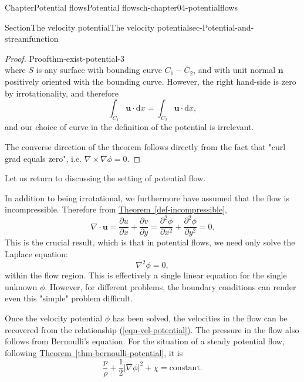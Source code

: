 \documentclass[oneside,10pt,]{book}
\newcommand{\xreffont}{\relax}
\numberwithin{equation}{section}
\newcommand{\de}{\mathrm{d}}
\newcommand{\pd}[2]{\frac{\partial#1}{\partial#2}}
\newcommand{\bn}{\boldsymbol{n}}
\newcommand{\bu}{\boldsymbol{u}}
\begin{document}
\begin{chapterptx}{Chapter}{Potential flows}{}{Potential flows}{}{}{ch-chapter04-potentialflows}
\begin{sectionptx}{Section}{The velocity potential}{}{The velocity potential}{}{}{sec-Potential-and-streamfunction}
\begin{introduction}{}
\begin{proof}{Proof}{}{thm-exist-potential-3}
\begin{equation*}
\end{equation*}
where \(S\) is any surface with bounding curve \(C_1 - C_2\), and with unit normal \(\bn\) positively oriented with the bounding curve. However, the right hand-side is zero by irrotationality, and therefore%
\begin{equation*}
\int_{C_1} \bu \cdot \de{x} = \int_{C_2} \bu \cdot \de{x},
\end{equation*}
and our choice of curve in the definition of the potential is irrelevant.%
\par
The converse direction of the theorem follows directly from the fact that "curl grad equals zero", i.e. \(\nabla \times \nabla \phi = 0\).%
\end{proof}
Let us return to discussing the setting of potential flow.%
\par
In addition to being irrotational, we furthermore have assumed that the flow is incompressible. Therefore from \hyperref[def-incompressible]{Theorem~{\xreffont\ref{def-incompressible}}},%
\begin{equation}
\nabla \cdot \bu = \pd{u}{x} + \pd{v}{y} = \pd{^2\phi}{x^2} + \pd{^2\phi}{y^2} = 0.\label{eqn-2d-divu}
\end{equation}
This is the crucial result, which is that in potential flows, we need only solve the Laplace equation:%
\begin{equation}
\nabla^2 \phi = 0,\label{eqn-2d-laplace}
\end{equation}
within the flow region. This is effectively a single linear equation for the single unknown \(\phi\). However, for different problems, the boundary conditions can render even this "simple" problem difficult.%
\par
Once the velocity potential \(\phi\) has been solved, the velocities in the flow can be recovered from the relationship \hyperref[eqn-vel-potential]{({\xreffont\ref{eqn-vel-potential}})}. The pressure in the flow also follows from Bernoulli's equation. For the situation of a steady potential flow, following \hyperref[thm-bernoulli-potential]{Theorem~{\xreffont\ref{thm-bernoulli-potential}}}, it is%
\begin{equation}
\frac{p}{\rho} + \frac{1}{2} |\nabla \phi|^2 + \chi = \textrm{constant}.\label{eqn-2d-bernoulli}
\end{equation}
%
\end{introduction}%
%
%
\typeout{************************************************}
\typeout{************************************************}

\end{sectionptx}
\end{chapterptx}
\end{document}
